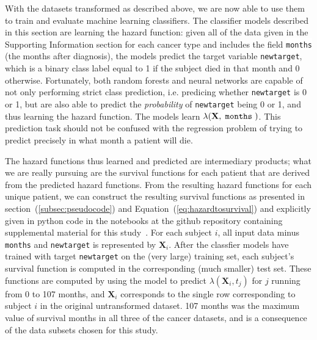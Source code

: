 \documentclass[10pt,letterpaper]{article}
\newcommand{\codewhite}[1]{\colorbox{white}{\texttt{#1}}}
\begin{document}
With the datasets transformed as described above, we are now able to use them to train and evaluate machine learning classifiers.
The classifier models described in this section are learning the hazard function: given all of the data given in the Supporting Information section for each cancer type and includes the field \codewhite{months} (the months after diagnosis), the models predict the target variable \codewhite{newtarget}, which is a binary class label equal to 1 if the subject died in that month and 0 otherwise.
Fortunately, both random forests and neural networks are capable of not only performing strict class prediction, i.e. predicing whether \codewhite{newtarget} is 0 or 1, but are also able to predict the \emph{probability} of \codewhite{newtarget} being 0 or 1, and thus learning the hazard function.
The models learn $\lambda(\mathbf{X}, \codewhite{months})$.
This prediction task should not be confused with the regression problem of trying to predict precisely in what month a patient will die.


The hazard functions thus learned and predicted are intermediary products; what we are really pursuing are the survival functions for each patient that are derived from the predicted hazard functions.
From the resulting hazard functions for each unique patient, we can construct the
resulting survival functions as presented in section~(\ref{subsec:pseudocode}) and Equation~(\ref{eq:hazardtosurvival}) and explicitly given in python code in the notebooks at the github repository containing supplemental material for this study~\cite{supp}.
For each subject $i$, all input data minus \codewhite{months} and \codewhite{newtarget} is represented by $\mathbf{X}_{i}$. After the classfier models have trained with target \codewhite{newtarget} on the (very large) training set, each subject's survival function is computed in the corresponding (much smaller) test set.
These functions are computed by using the model to predict $\lambda(\mathbf{X}_i, t_{j})$ for $j$ running from 0 to 107 months, and $\mathbf{X}_{i}$ corresponds to the single row corresponding to subject $i$ in the original untransformed dataset.
107 months was the maximum value of survival months in all three of the cancer datasets, and is a consequence of the data subsets chosen for this study.
\end{document}
